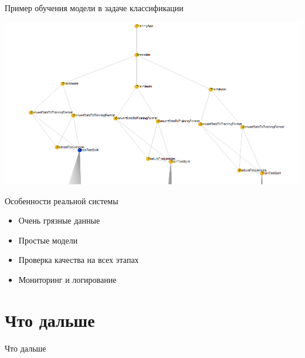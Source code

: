 \documentclass[10pt]{beamer}
\begin{document}
\begin{frame}{Пример обучения модели в задаче классификации}

\begin{center}
\includegraphics[scale=0.30]{images/podelie.png}
\end{center}

\end{frame}

\begin{frame}{Особенности реальной системы}

\begin{itemize}
\item Очень грязные данные
\item Простые модели
\item Проверка качества на всех этапах
\item Мониторинг и логирование
\end{itemize}

\end{frame}


\section{Что дальше}


\begin{frame}{}

\begin{center}
\Large Что дальше
\end{center}

\end{frame}
\end{document}
